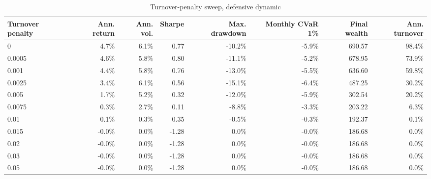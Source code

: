 \begin{table}[!htbp]
\centering
\caption{Turnover-penalty sweep, defensive dynamic}
\label{tab:allocation-turnover-penalty-defensive}
\small
\setlength{\tabcolsep}{5pt}
\renewcommand{\arraystretch}{1.12}
\begin{adjustbox}{center,max width=\linewidth}
\begin{tabular}{lrrrrrrr}
\toprule
Turnover penalty & Ann. return & Ann. vol. & Sharpe & Max. drawdown & Monthly CVaR 1\% & Final wealth & Ann. turnover \\
\midrule
0 & 4.7\% & 6.1\% & 0.77 & -10.2\% & -5.9\% & 690.57 & 98.4\% \\
0.0005 & 4.6\% & 5.8\% & 0.80 & -11.1\% & -5.2\% & 678.95 & 73.9\% \\
0.001 & 4.4\% & 5.8\% & 0.76 & -13.0\% & -5.5\% & 636.60 & 59.8\% \\
0.0025 & 3.4\% & 6.1\% & 0.56 & -15.1\% & -6.4\% & 487.25 & 30.2\% \\
0.005 & 1.7\% & 5.2\% & 0.32 & -12.0\% & -5.9\% & 302.54 & 20.2\% \\
0.0075 & 0.3\% & 2.7\% & 0.11 & -8.8\% & -3.3\% & 203.22 & 6.3\% \\
0.01 & 0.1\% & 0.3\% & 0.35 & -0.5\% & -0.3\% & 192.37 & 0.1\% \\
0.015 & -0.0\% & 0.0\% & -1.28 & 0.0\% & -0.0\% & 186.68 & 0.0\% \\
0.02 & -0.0\% & 0.0\% & -1.28 & 0.0\% & -0.0\% & 186.68 & 0.0\% \\
0.03 & -0.0\% & 0.0\% & -1.28 & 0.0\% & -0.0\% & 186.68 & 0.0\% \\
0.05 & -0.0\% & 0.0\% & -1.28 & 0.0\% & -0.0\% & 186.68 & 0.0\% \\
\bottomrule
\end{tabular}
\end{adjustbox}
\end{table}